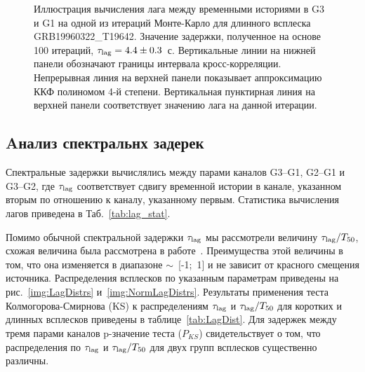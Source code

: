\begin{figure}[h]
  \caption{Иллюстрация вычисления лага между временными историями в G3 и G1 
  на одной из итераций Монте-Карло для длинного всплеска GRB19960322\_T19642. 
  Значение задержки, полученное на основе 100 итераций,  $\tau_{\mathrm{lag}}=4.4\pm0.3$~с. 
  Вертикальные линии на нижней панели обозначают границы интервала кросс-корреляции. 
  Непрерывная линия на верхней панели показывает аппроксимацию ККФ полиномом 4-й степени. 
  Вертикальная пунктирная линия на верхней панели соответствует значению лага на данной итерации.
  \label{fig:lag_calculation}}  
\end{figure}

\subsection{Aнализ спектральнх задерек}
Спектральные задержки вычислялись между парами каналов G3--G1, G2--G1 и G3--G2, 
где $\tau_{\mathrm{lag}}$ соответствует сдвигу временной истории в канале, указанном вторым
по отношению к каналу, указанному первым. Статистика вычисления лагов приведена в Таб.~\ref{tab:lag_stat}.



Помимо обычной спектральной задержки $\tau_{\mathrm{lag}}$ мы рассмотрели величину 
$\tau_{\mathrm{lag}} / T_{50}$, схожая величина была рассмотрена в работе~\citep{Ripa_2012}. 
Преимущества этой величины в том, что она изменяется в диапазоне $\sim$~[-1;~1] и 
не зависит от красного смещения источника.  Распределения всплесков по указанным 
параметрам приведены на рис.~\ref{img:LagDistrs} и~\ref{img:NormLagDistrs}. 
Результаты применения теста Колмогорова-Смирнова (KS) к распределениям 
$\tau_{\mathrm{lag}}$ и $\tau_{\mathrm{lag}} / T_{50}$ для коротких и длинных всплесков 
приведены в таблице~\ref{tab:LagDist}. Для задержек между тремя парами каналов 
p-значение теста ($P_{KS}$) свидетельствует о том, что распределения по $\tau_{\mathrm{lag}}$ 
и $\tau_{\mathrm{lag}} / T_{50}$  для двух групп всплесков существенно различны. 


